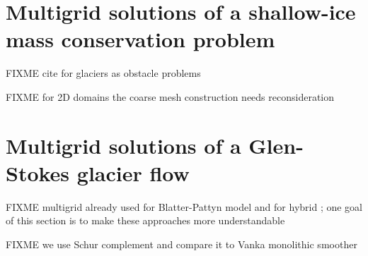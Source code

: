 \documentclass[letterpaper,final,12pt,reqno]{amsart}
\begin{document}
\section{Multigrid solutions of a shallow-ice mass conservation problem} \label{sec:sia}

FIXME cite for glaciers as obstacle problems \cite{Bueler2016,Bueler2020,Calvoetal2002,JouvetBueler2012}

FIXME for 2D domains the coarse mesh construction needs reconsideration

\section{Multigrid solutions of a Glen-Stokes glacier flow} \label{sec:stokes}

FIXME multigrid already used for Blatter-Pattyn model \cite{BrownSmithAhmadia2013} and for hybrid \cite{Jouvetetal2013}; one goal of this section is to make these approaches more understandable

FIXME we use Schur complement \cite{Bueler2021,Elmanetal2014} and compare it to Vanka monolithic smoother \cite{Farrelletal2019}

\small

\bigskip


\end{document}
